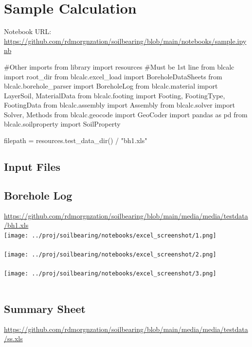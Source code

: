\chapter{Sample Calculation}
Notebook URL: \url{https://github.com/rdmorgnzation/soilbearing/blob/main/notebooks/sample.ipynb}\\

\begin{python}
#Other imports from library
import resources #Must be 1st line
from blcalc import root_dir
from blcalc.excel_load import BoreholeDataSheets
from blcalc.borehole_parser import BoreholeLog
from blcalc.material import LayerSoil, MaterialData
from blcalc.footing import Footing, FootingType, FootingData
from blcalc.assembly import Assembly
from blcalc.solver import Solver, Methods
from blcalc.geocode import GeoCoder
import pandas as pd
from blcalc.soilproperty import SoilProperty
\end{python}

\begin{python}
filepath = resources.test_data_dir() / "bh1.xls"
\end{python}

\section{Input Files}

\section{Borehole Log}
\url{https://github.com/rdmorgnzation/soilbearing/blob/main/media/media/testdata/bh1.xls}\\

\texttt{[image: ../proj/soilbearing/notebooks/excel\_screenshot/1.png]}\\\\
\texttt{[image: ../proj/soilbearing/notebooks/excel\_screenshot/2.png]}\\\\
\texttt{[image: ../proj/soilbearing/notebooks/excel\_screenshot/3.png]}\\\\

\section{Summary Sheet}
\url{https://github.com/rdmorgnzation/soilbearing/blob/main/media/media/testdata/ss.xls}\\

